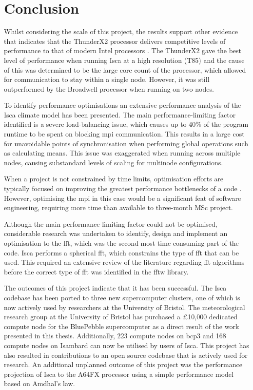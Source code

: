 \documentclass[a4paper,11pt]{report}
\begin{document}
\section{Conclusion}
Whilst considering the scale of this project, the results support other evidence that indicates that the ThunderX2 processor delivers competitive levels of performance to that of modern Intel processors \cite{mcintosh2018performance}. The ThunderX2 gave the best level of performance when running Isca at a high resolution (T85) and the cause of this was determined to be the large core count of the processor, which allowed for communication to stay within a single node. However, it was still outperformed by the Broadwell processor when running on two nodes. 
\par
To identify performance optimisations an extensive performance analysis of the Isca climate model has been presented. The main performance-limiting factor identified is a severe load-balancing issue, which causes up to 40\% of the program runtime to be spent on blocking \gls{mpi} communication. This results in a large cost for unavoidable points of synchronisation when performing global operations such as calculating means. This issue was exaggerated when running across multiple nodes, causing substandard levels of scaling for multinode configurations. 
\par
When a project is not constrained by time limits, optimisation efforts are typically focused on improving the greatest performance bottlenecks of a code \cite{asanovic2006landscape}. However, optimising the \gls{mpi} in this case would be a significant feat of software engineering, requiring more time than available to three-month MSc project.
\par
Although the main performance-limiting factor could not be optimised, considerable research was undertaken to identify, design and implement an optimisation to the \gls{fft}, which was the second most time-consuming part of the code. Isca performs a spherical \gls{fft}, which constrains the type of \gls{fft} that can be used. This required an extensive review of the literature regarding \gls{fft} algorithms before the correct type of \gls{fft} was identified in the \gls{fftw} library.
\par
The outcomes of this project indicate that it has been successful. The Isca codebase has been ported to three new supercomputer clusters, one of which is now actively used by researchers at the University of Bristol. The meteorological research group at the University of Bristol has purchased a £10,000 dedicated compute node for the BluePebble supercomputer as a direct result of the work presented in this thesis. Additionally, 223 compute nodes on \gls{bcp3} and 168 compute nodes on Isambard can now be utilised by users of Isca. This project has also resulted in contributions to an open source codebase that is actively used for research. An additional unplanned outcome of this project was the performance projection of Isca to the A64FX processor using a simple performance model based on Amdhal's law.
\par
\end{document}
